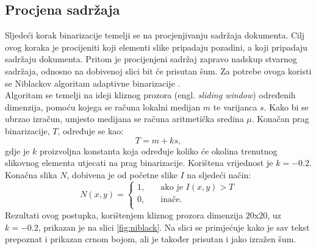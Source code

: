 \documentclass[times, utf8, zavrsni, numeric]{fer}
\begin{document}
\subsection{Procjena sadržaja}
Sljedeći korak binarizacije temelji se na procjenjivanju sadržaja dokumenta. 
Cilj ovog koraka je procijeniti koji elementi slike pripadaju pozadini, a koji pripadaju sadržaju dokumenta. 
Pritom je procijenjeni sadržaj zapravo nadskup stvarnog sadržaja, odnosno na dobivenoj slici bit će prisutan šum. 
Za potrebe ovoga koristi se Niblackov algoritam adaptivne binarizacije \cite{AdaptiveBinarization}.\\

Algoritam se temelji na ideji kliznog prozora (engl. \textit{sliding window}) određenih dimenzija, pomoću kojega se računa lokalni medijan  $m$ te varijanca $s$. 
Kako bi se ubrzao izračun, umjesto medijana se računa aritmetička sredina $\mu$.
Konačan prag binarizacije, $T$, određuje se kao:
\[ T = m + ks,\]
gdje je $k$ proizvoljna konstanta koja određuje koliko će okolina trenutnog slikovnog elementa utjecati na prag binarizacije.
Korištena vrijednost je $k = -0.2$.
Konačna slika $N$, dobivena je od početne slike $I$ na sljedeći način:
\[
    N(x, y) =
    \begin{cases}
        1,   & \quad \text{ako je } I(x, y) > T\\
        0,  & \quad \text{inače}.\\
    \end{cases}
\]
Rezultati ovog postupka, korištenjem kliznog prozora dimenzija $20$x$20$, uz $k=-0.2$, prikazan je na slici \ref{fig:niblack}.
Na slici se primjećuje kako je sav tekst prepoznat i prikazan crnom bojom, ali je također prisutan i jako izražen šum.
\end{document}

